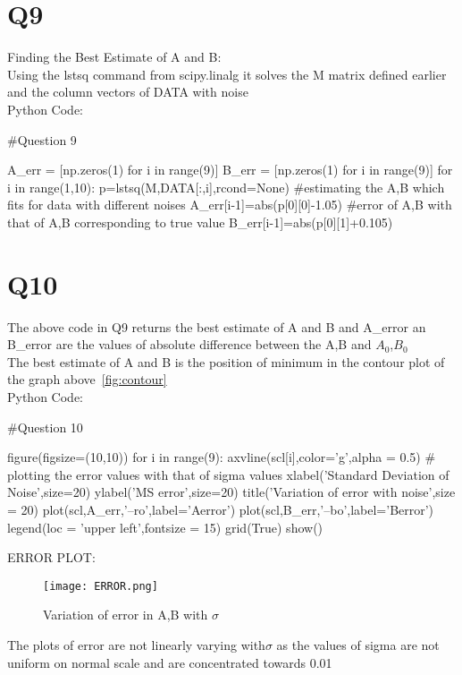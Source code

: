 \documentclass[12pt, a4paper]{report}
\begin{document}
\section*{Q9}
Finding the Best Estimate of A and B:\\
Using the lstsq command from scipy.linalg it solves the M matrix defined earlier and the column vectors of DATA with noise\\
Python Code:
\begin{py_code}
#Question 9

A_err = [np.zeros(1) for i in range(9)]
B_err = [np.zeros(1) for i in range(9)]
for i in range(1,10):
    p=lstsq(M,DATA[:,i],rcond=None)  #estimating the A,B which fits for data with different noises
    A_err[i-1]=abs(p[0][0]-1.05)      #error of A,B with that of A,B corresponding to true value
    B_err[i-1]=abs(p[0][1]+0.105)
\end{py_code}
\section*{Q10}
The above code in Q9 returns the best estimate of A and B and A\_error an B\_error are the values of absolute difference between the A,B and $A_0$,$B_0$  \\
The best estimate of A and B is the position of minimum in the contour plot of the graph above~\ref{fig:contour}\\
Python Code:
\begin{py_code}
#Question 10

figure(figsize=(10,10))
for i in range(9):
    axvline(scl[i],color='g',alpha = 0.5) # plotting the error values with that of sigma values
xlabel('Standard Deviation of Noise',size=20)
ylabel('MS error',size=20)
title('Variation of error with noise',size = 20)
plot(scl,A_err,'--ro',label='Aerror')
plot(scl,B_err,'--bo',label='Berror')
legend(loc = 'upper left',fontsize = 15)
grid(True)
show()
\end{py_code}
ERROR PLOT:
\begin{figure}[H]
	\centering
	\texttt{[image: ERROR.png]}  %
	\caption{Variation of error in A,B with $\sigma$}
	\label{fig:ERROR}
\end{figure} 
The plots of error are not linearly varying with$\sigma$ as the values of sigma are not uniform on normal scale and are concentrated towards 0.01 
\end{document}
